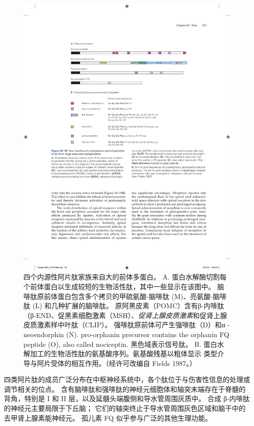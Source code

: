 \begin{figure}[htbp]
	\centering
	\includegraphics[width=1.0\linewidth]{chap20/fig_20_18}
	\caption{四个内源性阿片肽家族来自大的前体多蛋白。
		A. 蛋白水解酶切割每个前体蛋白以生成较短的生物活性肽，其中一些显示在该图中。
		脑啡肽原前体蛋白包含多个拷贝的甲硫氨酸-脑啡肽 (M)、亮氨酸-脑啡肽 (L) 和几种扩展的脑啡肽。
		原阿黑皮素（POMC）含有β-内啡肽（β-END、促黑素细胞激素（MSH）、\textit{促肾上腺皮质激素}和促肾上腺皮质激素样中叶肽（CLIP）。
		强啡肽原前体可产生强啡肽（D）和α -neoendorphin (N). pro-orphanin precursor contains the orphanin FQ peptide (O), also called nociceptin. 黑色域表示信号肽。
		B. 蛋白水解加工的生物活性肽的氨基酸序列。氨基酸残基以粗体显示 类型介导与阿片受体的相互作用。（经许可改编自 Fields 1987。）}
	\label{fig:20_18}
\end{figure}


四类阿片肽的成员广泛分布在中枢神经系统中，各个肽位于与伤害性信息的处理或调节相关的位点。
含有脑啡肽和强啡肽的神经元细胞体和轴突末端存在于脊髓的背角，特别是 I 和 II 层，以及延髓头端腹侧和导水管周围灰质中。
合成 β-内啡肽的神经元主要局限于下丘脑；
它们的轴突终止于导水管周围灰色区域和脑干中的去甲肾上腺素能神经元。
孤儿素 FQ 似乎参与广泛的其他生理功能。



